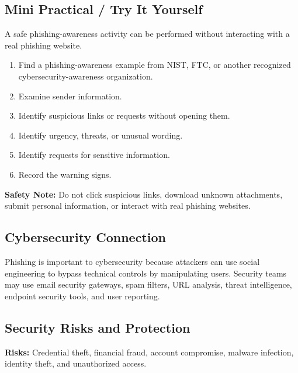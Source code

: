 \documentclass[12pt,a4paper]{article}
\begin{document}
\subsection{Mini Practical / Try It Yourself}

A safe phishing-awareness activity can be performed without interacting with a real phishing website.

\begin{enumerate}
    \item Find a phishing-awareness example from NIST, FTC, or another recognized cybersecurity-awareness organization.
    \item Examine sender information.
    \item Identify suspicious links or requests without opening them.
    \item Identify urgency, threats, or unusual wording.
    \item Identify requests for sensitive information.
    \item Record the warning signs.
\end{enumerate}

\textbf{Safety Note:} Do not click suspicious links, download unknown attachments, submit personal information, or interact with real phishing websites.


\subsection{Cybersecurity Connection}

Phishing is important to cybersecurity because attackers can use social engineering to bypass technical controls by manipulating users. Security teams may use email security gateways, spam filters, URL analysis, threat intelligence, endpoint security tools, and user reporting.


\subsection{Security Risks and Protection}

\textbf{Risks:} Credential theft, financial fraud, account compromise, malware infection, identity theft, and unauthorized access.
\end{document}
